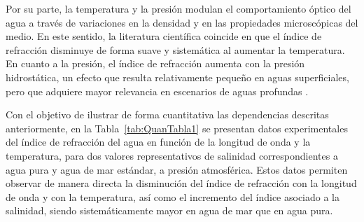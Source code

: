 Por su parte, la temperatura y la presión modulan el comportamiento óptico del agua a través de variaciones en la densidad y en las propiedades microscópicas del medio. En este sentido, la literatura científica coincide en que el índice de refracción disminuye de forma suave y sistemática al aumentar la temperatura. En cuanto a la presión, el índice de refracción aumenta con la presión hidrostática, un efecto que resulta relativamente pequeño en aguas superficiales, pero que adquiere mayor relevancia en escenarios de aguas profundas \cite{Millard, Quan}.

Con el objetivo de ilustrar de forma cuantitativa las dependencias descritas anteriormente, en la Tabla~\ref{tab:QuanTabla1} se presentan datos experimentales del índice de refracción del agua en función de la longitud de onda y la temperatura, para dos valores representativos de salinidad correspondientes a agua pura y agua de mar estándar, a presión atmosférica. Estos datos permiten observar de manera directa la disminución del índice de refracción con la longitud de onda y con la temperatura, así como el incremento del índice asociado a la salinidad, siendo sistemáticamente mayor en agua de mar que en agua pura.

